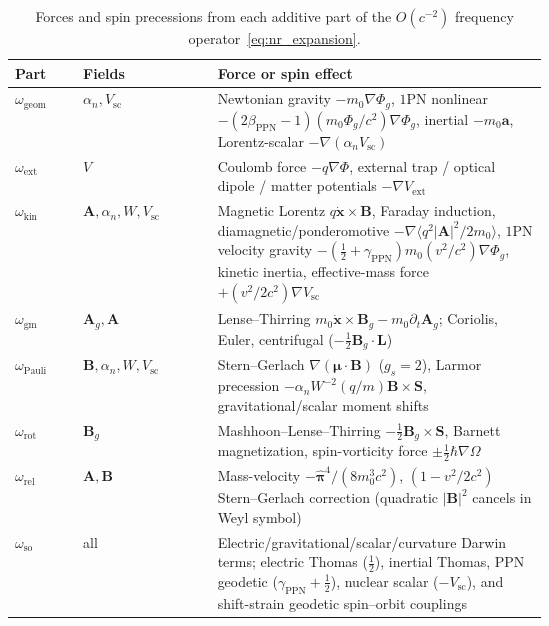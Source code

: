 \documentclass[aps,prd,onecolumn,tightenlines,nofootinbib,notitlepage,10pt,floatfix]{revtex4-2}
\theoremstyle{indentedtheorem}
\begin{document}
\begin{table}[htbp]
\centering
\footnotesize
\caption{Forces and spin precessions from each additive part of the $O(c^{-2})$ frequency operator~\eqref{eq:nr_expansion}.}
\label{tab:forces}
\begin{tabular}{llp{0.62\linewidth}}
\toprule
\textbf{Part} & \textbf{Fields} & \textbf{Force or spin effect} \\
\midrule
$\omega_\text{geom}$ & $\alpha_n,V_\text{sc}$ & Newtonian gravity $-m_0\nabla\Phi_g$, $1$PN nonlinear $-(2\beta_\text{PPN}-1)(m_0\Phi_g/c^2)\nabla\Phi_g$, inertial $-m_0\mathbf{a}$, Lorentz-scalar $-\nabla(\alpha_n V_\text{sc})$ \\
$\omega_\text{ext}$ & $V$ & Coulomb force $-q\nabla\Phi$, external trap / optical dipole / matter potentials $-\nabla V_\text{ext}$ \\
$\omega_\text{kin}$ & $\mathbf{A},\alpha_n,W,V_\text{sc}$ & Magnetic Lorentz $q\dot{\mathbf{x}}\times\mathbf{B}$, Faraday induction, diamagnetic/ponderomotive $-\nabla\langle q^2|\mathbf{A}|^2/2m_0\rangle$, $1$PN velocity gravity $-(\tfrac{1}{2}+\gamma_\text{PPN})m_0(v^2/c^2)\nabla\Phi_g$, kinetic inertia, effective-mass force $+(v^2/2c^2)\nabla V_\text{sc}$ \\
$\omega_\text{gm}$ & $\mathbf{A}_g,\mathbf{A}$ & Lense--Thirring $m_0\dot{\mathbf{x}}\times\mathbf{B}_g-m_0\partial_t\mathbf{A}_g$; Coriolis, Euler, centrifugal ($-\tfrac{1}{2}\mathbf{B}_g\cdot\mathbf{L}$) \\
$\omega_\text{Pauli}$ & $\mathbf{B},\alpha_n,W,V_\text{sc}$ & Stern--Gerlach $\nabla(\boldsymbol{\mu}\cdot\mathbf{B})$ ($g_s=2$), Larmor precession $-\alpha_n W^{-2}(q/m)\mathbf{B}\times\mathbf{S}$, gravitational/scalar moment shifts \\
$\omega_\text{rot}$ & $\mathbf{B}_g$ & Mashhoon--Lense--Thirring $-\tfrac{1}{2}\mathbf{B}_g\times\mathbf{S}$, Barnett magnetization, spin-vorticity force $\pm\tfrac{1}{2}\hbar\nabla\Omega$ \\
$\omega_\text{rel}$ & $\mathbf{A},\mathbf{B}$ & Mass-velocity $-\hat{\boldsymbol{\pi}}^4/(8m_0^3 c^2)$, $(1-v^2/2c^2)$ Stern--Gerlach correction (quadratic $|\mathbf{B}|^2$ cancels in Weyl symbol) \\
$\omega_\text{so}$ & all & Electric/gravitational/scalar/curvature Darwin terms; electric Thomas ($\tfrac{1}{2}$), inertial Thomas, PPN geodetic ($\gamma_\text{PPN}+\tfrac{1}{2}$), nuclear scalar ($-V_\text{sc}$), and shift-strain geodetic spin--orbit couplings \\
\bottomrule
\end{tabular}
\end{table}
\end{document}
